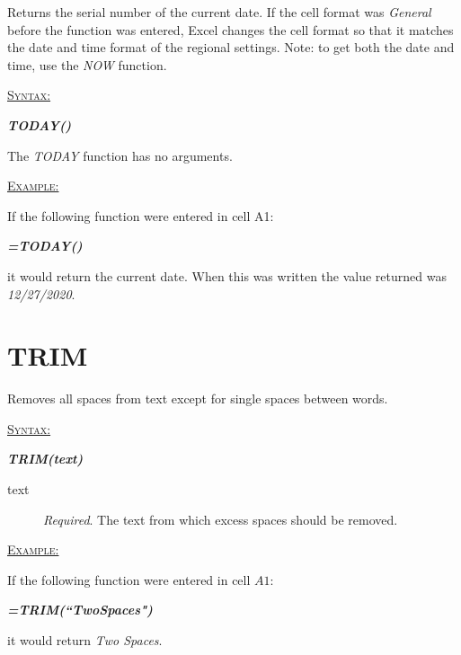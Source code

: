 Returns the serial number of the current date. If the cell format was \textit{General} before the function was entered, Excel changes the cell format so that it matches the date and time format of the regional settings. Note: to get both the date and time, use the \textit{NOW} function.

\begin{addmargin}[1cm]{0cm}
	
	\medskip
	\underline{\textsc{Syntax:}}
	\medskip
	
	{\color{Syntax}
		\noindent\textbf{\textit{TODAY()}}
	}
	
	\medskip
	\noindent The \textit{TODAY} function has no arguments.
	
	\medskip
	\noindent\underline{\textsc{Example:}}
	\medskip
	
	\noindent If the following function were entered in cell A1:
	
	{\color{Syntax}
		\textit{\textbf{=TODAY()}}
	}
	
	\noindent it would return the current date. When this was written the value returned was \textit{12/27/2020}.
	
	
\end{addmargin}

\section{TRIM}

Removes all spaces from text except for single spaces between words. 

\begin{addmargin}[1cm]{0cm}
	
	\medskip
	\underline{\textsc{Syntax:}}
	\medskip
	
	{\color{Syntax}
		\noindent\textbf{\textit{TRIM(text)}}
	}
	
	\begin{description}
		\item[text] \textit{Required}. The text from which excess spaces should be removed.
	\end{description}

	\medskip
	\noindent\underline{\textsc{Example:}}
	\medskip
	
	\noindent If the following function were entered in cell $ A1 $:
	
	{\color{Syntax}
		\textit{\textbf{=TRIM(``\:\:\:Two\:\:\:\:\:Spaces\:\:\:\:")}}
	}
	
	\noindent it would return \textit{Two Spaces}.

\end{addmargin}

